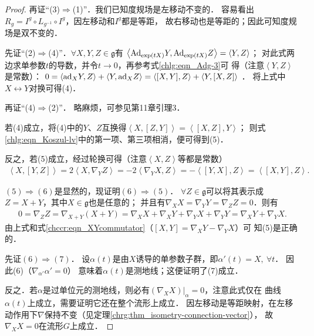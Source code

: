 \begin{proof}
    再证“(3)$\Rightarrow$(1)”．我们已知度规场是左移动不变的．
    容易看出$R_g = I^g\circ L_{g^{-1}}\circ I^g$，因左移动和$I^g$都是等距，
    故右移动也是等距的；因此可知度规场是双不变的．
    
    
    先证“(2)$\Rightarrow$(4)”．$\forall X,Y,Z\in \mathfrak{g}$有
    $\left<{\rm Ad}_{\exp(tX)}Y,{\rm Ad}_{\exp(tX)}Z\right>=\left<Y,Z\right>$；
    对此式两边求单参数$t$的导数，并令$t\to 0$，再参考式\eqref{chlg:eqn_Adg-3}可
    得（注意$\left<Y,Z\right>$是常数）：
    $ 0= \left<{\rm ad}_{X}Y,Z\right>+\left<Y,{\rm ad}_X Z\right>
    =\left<[X,Y],Z\right> + \left<Y,[X,Z]\right> $ ．
    将上式中$X\leftrightarrow Y$对换可得(4)．
    
    再证“(4)$\Rightarrow$(2)”．    略麻烦，可参见\parencite{oneill1983}第11章引理3．
    
    若(4)成立，将(4)中的$Y$、$Z$互换得$\left<X,[Z,Y]\right>=\left<[X,Z],Y\right>$；
    则式\eqref{chlg:eqn_Koszul-lv}中的第一项、第三项相消，便可得到(5)．
    
    反之，若(5)成立，经过轮换可得（注意$\left< X,Z\right>$等都是常数）
    \begin{align*}
        \left< X,[Y,Z]\right> = 2 \left<X, \nabla_Y Z \right> 
        =- 2 \left<\nabla_Y X, Z \right> 
        =- \left< [Y,X], Z \right> = \left< [X,Y], Z \right> .
    \end{align*}
    
    
    $(5)\Rightarrow (6)$是显然的，现证明$(6)\Rightarrow (5)$．
    $\forall Z\in \mathfrak{g}$可以将其表示成$Z=X+Y$，其中$X\in \mathfrak{g}$也是任意的；
    并且有$\nabla_X X =\nabla_Y Y =\nabla_Z Z =0$．则有
    \begin{align*}
        0=\nabla_Z Z =\nabla_{X+Y}(X+Y)= \nabla_X X+\nabla_X Y+\nabla_Y X+\nabla_Y Y
        =\nabla_X Y+\nabla_Y X .
    \end{align*}
    由上式和式\eqref{chccr:eqn_XYcommutator}（$\left[ {X,Y} \right] = \nabla_X Y - \nabla_Y X$）可
    知(5)是正确的．
    
    先证$(6)\Rightarrow (7)$．
    设$\alpha(t)$是由$X$诱导的单参数子群，即$\alpha'(t)=X,\ \forall t$．
    因此(6)（$\nabla_{\alpha'} \alpha'=0$）
    意味着$\alpha(t)$是测地线；这便证明了(7)成立．
    
    反之．若$\alpha$是过单位元的测地线，则必有$(\nabla_X X)|_{\alpha}=0$，注意此式仅在
    曲线$\alpha(t)$上成立，需要证明它还在整个流形上成立．
    因左移动是等距映射，在左移动作用下$\nabla$保持不变（见定理\ref{chrg:thm_isometry-connection-vector}），
    故$\nabla_X X=0$在流形$G$上成立．    
\end{proof}

